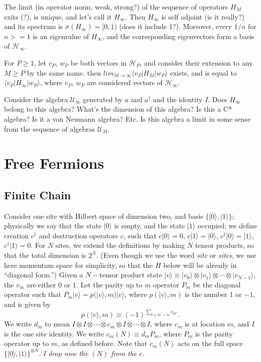 	
	The limit (in operator norm, weak, strong?) of the sequence of operators $H_M$ exits (?), is unique, and let's call it $H_\infty$.
	Then $H_\infty$ is self adjoint (is it really?) and its spectrum is $\sigma(H_\infty) = [0, 1)$ (does it include 1?).
    Moreover, every $1/n$ for $n>=1$ is an eigenvalue of $H_\infty$, and the corresponding eigenvectors form a basis of $\mathcal{H}_\infty$.
    
	For $P\ge 1$, let  $v_P,\,w_P$ be both vectors in $\mathcal{H}_P$, and consider their extension to any $M\ge P$ by the same name. 
	then $lim_{M\rightarrow\infty} \langle v_P | H_M | w_P\rangle$ exists, and is equal to
	$\langle v_P | H_\infty | w_P\rangle$, where $v_P,\,w_P$ are considered vectors of $\mathcal{H}_\infty$.
	
Consider the algebra $\mathcal{U}_\infty$ generated by $a$ and $a^\dagger$ and the identity $I$. Does $H_\infty$ belong to this algebra?
What's the dimension of this algebra? Is this a C* algebra? Is it a von Neumann algebra? Etc.
	Is this algebra a limit in some sense from the sequence of algebras $\mathcal{U}_M$.
	
	\section{Free Fermions}
	\subsection{Finite Chain}
	Consider one site with Hilbert space of dimension two,  and basis $\{|0\rangle, |1\rangle\}$; physically we say
	that the state $|0\rangle$ is empty, and the state $|1\rangle$ occupied;
	we define creation $c^\dagger$ and destruction operators $c$,
	such that $c|0\rangle=0$, $c|1\rangle=|0\rangle$, $c^\dagger|0\rangle=|1\rangle$, $c^\dagger|1\rangle=0$.
	For $N$ sites, we extend the definitions by making $N$ tensor products, so that the total dimension is $2^N$.
	(Even though we use the word \emph{site} or \emph{sites}, we use here momentum space for simplicity, 
	so that the $H$ below will be already in ``diagonal form.'')
	Given a $N-$tensor product state $|v\rangle\equiv|v_0\rangle\otimes|v_1\rangle\otimes\cdots\otimes|v_{N-1}\rangle$, 
	the $v_m$ are either $0$ or $1$. Let the parity up to 
	$m$ operator $P_m$ be the diagonal operator such that  $P_m|v\rangle = p(|v\rangle, m)|v\rangle$, where
	$p(|v\rangle, m)$ is the number $1$ or $-1$, and is given by 
	\begin{equation}
	p(|v\rangle, m)\equiv(-1)^{\sum_{0\le m'<m} v_{m'}}.
	\end{equation}
	We write $d_m$ to mean $I\otimes I\otimes\cdots \otimes c_m \otimes I \otimes \cdots\otimes I$, where $c_m$ is at location $m$,
	and $I$ is the one site identity. We write $c_m (N) \equiv d_m P_m$, where $P_m$ is the parity operator up to $m$, as defined before.
	Note that $c_m (N)$ acts on the full space $\{|0\rangle, |1\rangle\}^{\otimes N}$. \emph{I drop now the $(N)$ from the $c$.}
	
